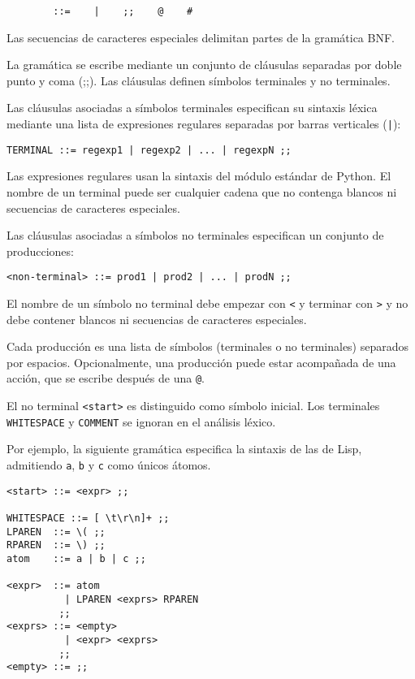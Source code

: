 \documentclass{article}
\begin{document}
\begin{verbatim}
        ::=    |    ;;    @    #
\end{verbatim}
Las secuencias de caracteres especiales delimitan partes de
la gram\'atica BNF.

La gram\'atica se escribe mediante un conjunto de cl\'ausulas
separadas por doble punto y coma (\textsc{;;}).
Las cl\'ausulas definen s\'imbolos terminales y no terminales.

Las cl\'ausulas asociadas a s\'imbolos terminales especifican
su sintaxis l\'exica mediante una lista de expresiones regulares
separadas por barras verticales (\verb`|`):

\begin{verbatim}
TERMINAL ::= regexp1 | regexp2 | ... | regexpN ;;
\end{verbatim}
Las expresiones regulares usan la sintaxis del m\'odulo 
est\'andar de Python.
El nombre de un terminal puede ser cualquier cadena que no
contenga blancos ni secuencias de caracteres especiales.

Las cl\'ausulas asociadas a s\'imbolos no terminales
especifican un conjunto de producciones:

\begin{verbatim}
<non-terminal> ::= prod1 | prod2 | ... | prodN ;;
\end{verbatim}
El nombre de un s\'imbolo no terminal debe empezar con \verb|<|
y terminar con \verb|>| y no debe contener blancos ni
secuencias de caracteres especiales.

Cada producci\'on es una lista de s\'imbolos (terminales o
no terminales) se\-pa\-ra\-dos por espacios.
Opcionalmente, una producci\'on puede estar acompa\~nada
de una acci\'on, que se escribe despu\'es de una \verb|@|.

El no terminal \verb|<start>| es distinguido como
s\'imbolo inicial. Los terminales \verb|WHITESPACE| y \verb|COMMENT|
se ignoran en el an\'alisis l\'exico.

Por ejemplo, la siguiente gram\'atica especifica la sintaxis
de las  de Lisp, admitiendo
\verb|a|, \verb|b| y \verb|c| como \'unicos \'atomos.

\begin{verbatim}
<start> ::= <expr> ;;

WHITESPACE ::= [ \t\r\n]+ ;;
LPAREN  ::= \( ;;
RPAREN  ::= \) ;;
atom    ::= a | b | c ;;

<expr>  ::= atom
          | LPAREN <exprs> RPAREN
         ;;
<exprs> ::= <empty>
          | <expr> <exprs>
         ;;
<empty> ::= ;;
\end{verbatim}
\end{document}
